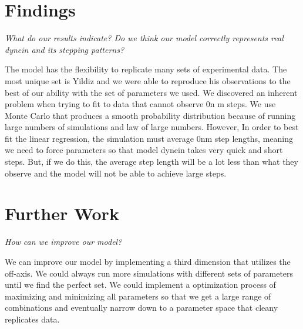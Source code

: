 \section{Findings}
\textit{What do our results indicate? Do we think our model correctly represents real dynein and its stepping patterns?}

The model has the flexibility to replicate many sets of experimental data. The most unique set is Yildiz and we were able to reproduce his observations to the best of our ability with the set of parameters we used. We discovered an inherent problem when trying to fit to data that cannot observe 0n m steps. We use Monte Carlo that produces a smooth probability distribution because of running large numbers of simulations and law of large numbers. However, In order to best fit the linear regression, the simulation must average 0nm step lengths, meaning we need to force parameters so that model dynein takes very quick and short steps. But, if we do this, the average step length will be a lot less than what they observe and the model will not be able to achieve large steps. 



\section{Further Work}
\textit{How can we improve our model?}

We can improve our model by implementing a third dimension that utilizes the off-axis. We could always run more simulations with different sets of parameters until we find the perfect set. We could implement a optimization process of maximizing and minimizing all parameters so that we get a large range of combinations and eventually narrow down to a parameter space that cleany replicates data. 